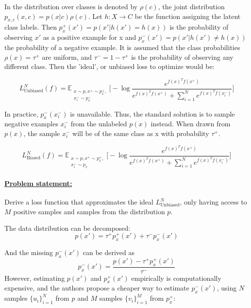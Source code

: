 \documentclass{article}
\begin{document}
In \citep{chuang2021debiased} the distribution over classes is denoted by $\rho(c)$, the joint distribution $p_{x,c}(x, c) = p(x|c)\rho(c)$. Let $h : X \rightarrow C$ be the function assigning the latent class labels. Then $p^+_x(x') = p(x'|h(x') = h(x))$ is the probability of observing $x'$ as a positive example for x and $p^-_x(x') = p(x'|h(x') \neq h(x))$ the probability of a negative example. It is assumed that the class probabilities $\rho(x) = \tau^+$ are uniform, and $\tau^- = 1 - \tau^+$ is the probability of observing any different class. Then the 'ideal', or unbiased loss to optimize would be:

\begin{equation}
L_{\text{Unbiased}}^N(f) = \mathbb{E}_{\substack{x \sim p, x^+ \sim p^+_x,\\ x_i^- \sim p_x^-}} \bigg[-\log \frac{e^{f(x)^T f(x^+)}}{e^{f(x)^T f(x^+)} + \sum _{i=1}^N e^{f(x)^T f(x_i^-)}}\bigg]
\end{equation}

In practice, $p_x^-(x_i^-)$ is unavailable.
Thus, the standard solution is to sample negative examples $x_i^-$ from the unlabeled $p(x)$ instead. When drawn from $p(x)$, the sample $x_i^-$ will be of the same class as x with probability $\tau^+$.

\begin{equation}
L_{\text{Biased}}^N(f) = \mathbb{E}_{\substack{x \sim p, x^+ \sim p^+_x,\\ x_i^- \sim p_x}} \bigg[-\log \frac{e^{f(x)^T f(x^+)}}{e^{f(x)^T f(x^+)} + \sum _{i=1}^N e^{f(x)^T f(x_i^-)}}\bigg]
\end{equation}

\paragraph{\underline{Problem statement:}} Derive a loss function that approximates the ideal $L_{\text{Unbiased}}^N$, only having access to $M$ positive samples and samples from the distribution $p$.



The data distribution can be decomposed:
\begin{equation}
p(x') = \tau^+ p^+_x(x') + \tau^-p_x^-(x')
\end{equation}

And the missing $p^-_x(x')$ can be derived as
\begin{equation} \label{eq:5}
p_x^-(x') = \frac{p(x') - \tau^+ p^+_x(x')}{\tau^-}
\end{equation}
However, estimating $p(x')$ and $p^+_x(x')$ empirically is computationally expensive, and the authors propose a cheaper way to estimate $p^-_x(x')$, using $N$ samples $\{u_i\}_{i=1}^N$ from $p$ and $M$ samples $\{v_i\}_{i=1}^M$ from $p_x^+$:
\end{document}
